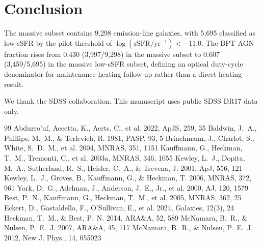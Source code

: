 \documentclass[twocolumn]{aastex631}
\begin{document}
\section{Conclusion}\label{sec:conclusion}
The massive subset contains 9,298 emission-line galaxies, with 5,695 classified as low-sSFR by the pilot threshold of $\log(\mathrm{sSFR}/\mathrm{yr}^{-1}) < -11.0$. The BPT AGN fraction rises from 0.430 (3,997/9,298) in the massive subset to 0.607 (3,459/5,695) in the massive low-sSFR subset, defining an optical duty-cycle denominator for maintenance-heating follow-up rather than a direct heating result.

\begin{acknowledgments}
We thank the SDSS collaboration. This manuscript uses public SDSS DR17 data only.
\end{acknowledgments}
\begin{thebibliography}{99}
 Abdurro'uf, Accetta, K., Aerts, C., et al. 2022, ApJS, 259, 35
 Baldwin, J.~A., Phillips, M.~M., \& Terlevich, R. 1981, PASP, 93, 5
 Brinchmann, J., Charlot, S., White, S.~D.~M., et al. 2004, MNRAS, 351, 1151
 Kauffmann, G., Heckman, T.~M., Tremonti, C., et al. 2003a, MNRAS, 346, 1055
 Kewley, L.~J., Dopita, M.~A., Sutherland, R.~S., Heisler, C.~A., \& Trevena, J. 2001, ApJ, 556, 121
 Kewley, L.~J., Groves, B., Kauffmann, G., \& Heckman, T. 2006, MNRAS, 372, 961
 York, D.~G., Adelman, J., Anderson, J.~E., Jr., et al. 2000, AJ, 120, 1579
 Best, P.~N., Kauffmann, G., Heckman, T.~M., et al. 2005, MNRAS, 362, 25
 Eckert, D., Gastaldello, F., O'Sullivan, E., et al. 2024, Galaxies, 12(3), 24
 Heckman, T.~M., \& Best, P.~N. 2014, ARA\&A, 52, 589
 McNamara, B.~R., \& Nulsen, P.~E.~J. 2007, ARA\&A, 45, 117
 McNamara, B.~R., \& Nulsen, P.~E.~J. 2012, New J. Phys., 14, 055023
\end{thebibliography}
\end{document}

